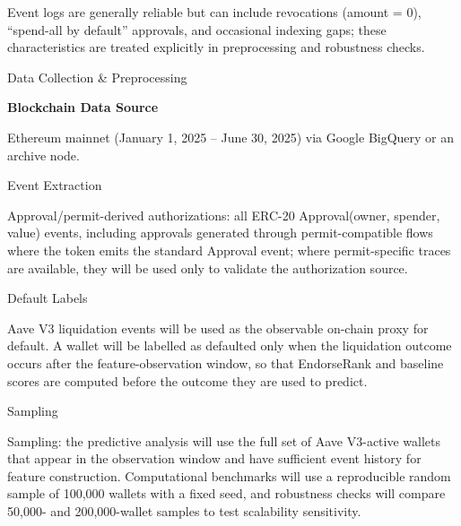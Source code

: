 \documentclass[12pt]{article}
\begin{document}
Event logs are generally reliable but can include revocations (amount = 0), ``spend-all by default'' approvals, and occasional indexing gaps; these characteristics are treated explicitly in preprocessing and robustness checks.


Data Collection \& Preprocessing


\textbf{Blockchain Data Source}


Ethereum mainnet (January 1, 2025 -- June 30, 2025) via Google BigQuery or an archive node.


Event Extraction


Approval/permit-derived authorizations: all ERC-20 Approval(owner, spender, value) events, including approvals generated through permit-compatible flows where the token emits the standard Approval event; where permit-specific traces are available, they will be used only to validate the authorization source.


Default Labels


Aave V3 liquidation events will be used as the observable on-chain proxy for default. A wallet will be labelled as defaulted only when the liquidation outcome occurs after the feature-observation window, so that EndorseRank and baseline scores are computed before the outcome they are used to predict.


Sampling


Sampling: the predictive analysis will use the full set of Aave V3-active wallets that appear in the observation window and have sufficient event history for feature construction. Computational benchmarks will use a reproducible random sample of 100,000 wallets with a fixed seed, and robustness checks will compare 50,000- and 200,000-wallet samples to test scalability sensitivity.
\end{document}
